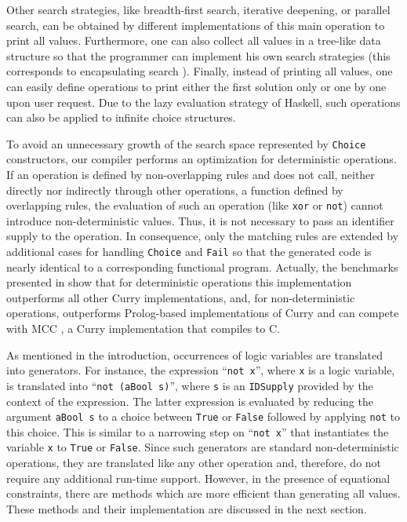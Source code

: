 \documentclass{llncs}
\newcommand{\code}[1]{\mbox{\small\texttt{#1}}}
\newcommand{\ccode}[1]{``\code{#1}''}
\begin{document}
Other search strategies, like
breadth-first search, iterative deepening, or parallel search,
can be obtained by different implementations of this main operation
to print all values.
Furthermore, one can also collect all values in a tree-like data structure
so that the programmer can implement his own search strategies
(this corresponds to encapsulating search \cite{BrasselHanusHuch04JFLP}).
Finally, instead of printing all values, one can easily define operations
to print either the first solution only or one by one upon user request.
Due to the lazy evaluation strategy of Haskell,
such operations can also be applied to infinite choice structures.

To avoid an unnecessary growth of the search space represented by
\code{Choice} constructors, our compiler performs an optimization for
deterministic operations. If an operation is defined by non-overlapping
rules and does not call, neither directly nor indirectly through
other operations, a function defined by overlapping rules,
the evaluation of such an operation (like \code{xor} or \code{not})
cannot introduce non-deterministic values.
Thus, it is not necessary to pass an identifier supply to the operation.
In consequence, only the matching rules are extended by additional cases
for handling \code{Choice} and \code{Fail} so that the generated code
is nearly identical to a corresponding functional program.
Actually, the benchmarks presented in \cite{BrasselHanusPeemoellerReck11}
show that for deterministic operations this implementation outperforms 
all other Curry implementations,
and, for non-deterministic operations, outperforms Prolog-based
implementations of Curry and can compete with MCC \cite{Lux99FLOPS},
a Curry implementation that compiles to C.

As mentioned in the introduction, occurrences of logic variables are
translated into generators.
For instance, the expression \ccode{not x}, where \code{x} is a logic variable,
is translated into \ccode{not (aBool s)}, where \code{s} is an \code{IDSupply}
provided by the context of the expression. The latter expression is 
evaluated by reducing the
argument \code{aBool s} to a choice between \code{True} or \code{False}
followed by applying \code{not} to this choice.
This is similar to a narrowing step on \ccode{not x}
that instantiates the variable \code{x} to \code{True} or \code{False}.
Since such generators are standard
non-deterministic operations, they are translated like any other operation
and, therefore, do not require any additional run-time support.
However, in the presence of equational constraints,
there are methods which are more efficient than generating all values.
These methods and their implementation are discussed in the
next section.
\end{document}
